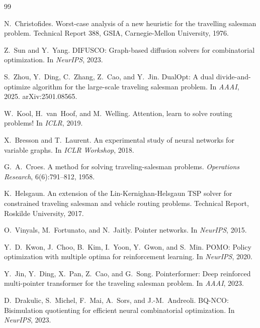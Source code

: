 \documentclass[11pt,a4paper]{ctexart}
\begin{document}

\begin{thebibliography}{99}

N.~Christofides.
\newblock Worst-case analysis of a new heuristic for the travelling salesman problem.
\newblock Technical Report 388, GSIA, Carnegie-Mellon University, 1976.

Z.~Sun and Y.~Yang.
\newblock DIFUSCO: Graph-based diffusion solvers for combinatorial optimization.
\newblock In \emph{NeurIPS}, 2023.

S.~Zhou, Y.~Ding, C.~Zhang, Z.~Cao, and Y.~Jin.
\newblock DualOpt: A dual divide-and-optimize algorithm for the large-scale traveling salesman problem.
\newblock In \emph{AAAI}, 2025. arXiv:2501.08565.

W.~Kool, H.~van~Hoof, and M.~Welling.
\newblock Attention, learn to solve routing problems!
\newblock In \emph{ICLR}, 2019.

X.~Bresson and T.~Laurent.
\newblock An experimental study of neural networks for variable graphs.
\newblock In \emph{ICLR Workshop}, 2018.

G.~A.~Croes.
\newblock A method for solving traveling-salesman problems.
\newblock \emph{Operations Research}, 6(6):791--812, 1958.

K.~Helsgaun.
\newblock An extension of the Lin-Kernighan-Helsgaun TSP solver for constrained traveling salesman and vehicle routing problems.
\newblock Technical Report, Roskilde University, 2017.

O.~Vinyals, M.~Fortunato, and N.~Jaitly.
\newblock Pointer networks.
\newblock In \emph{NeurIPS}, 2015.

Y.~D.~Kwon, J.~Choo, B.~Kim, I.~Yoon, Y.~Gwon, and S.~Min.
\newblock POMO: Policy optimization with multiple optima for reinforcement learning.
\newblock In \emph{NeurIPS}, 2020.

Y.~Jin, Y.~Ding, X.~Pan, Z.~Cao, and G.~Song.
\newblock Pointerformer: Deep reinforced multi-pointer transformer for the traveling salesman problem.
\newblock In \emph{AAAI}, 2023.

D.~Drakulic, S.~Michel, F.~Mai, A.~Sors, and J.-M.~Andreoli.
\newblock BQ-NCO: Bisimulation quotienting for efficient neural combinatorial optimization.
\newblock In \emph{NeurIPS}, 2023.


\end{thebibliography}
\end{document}
